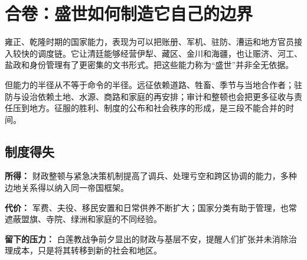 \section{合卷：盛世如何制造它自己的边界}

雍正、乾隆时期的国家能力，表现为可以把账册、军机、驻防、漕运和地方官员接入较快的调度链。它让清廷能够经营伊犁、藏区、金川和海疆，也让赈济、河工、盐政和身份管理有了更密集的文书形式。把这些能力称为“盛世”并非全无依据。

但能力的半径从不等于命令的半径。远征依赖道路、牲畜、季节与当地合作者；驻防与设治依赖土地、水源、商路和家庭的再安排；审计和整顿也会把更多征收与责任压到地方。征服的胜利、制度的公布和社会秩序的形成，是三段不能合并的时间。

\subsection{制度得失}

\textbf{所得：} 财政整顿与紧急决策机制提高了调兵、处理亏空和跨区协调的能力，多种边地关系得以纳入同一帝国框架。

\textbf{代价：} 军费、夫役、移民安置和日常供养不断扩大；国家分类有助于管理，也常遮蔽盟旗、寺院、绿洲和家庭的不同经验。

\textbf{留下的压力：} 白莲教战争前夕显出的财政与基层不安，提醒人们扩张并未消除治理成本，只是将其转移到新的社会和地区。
